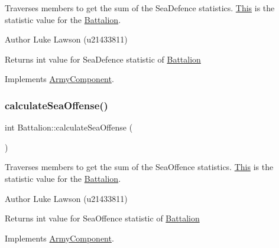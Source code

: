 Traverses members to get the sum of the Sea\+Defence statistics. \mbox{\hyperlink{class_this}{This}} is the statistic value for the \mbox{\hyperlink{class_battalion}{Battalion}}. 

\begin{DoxyAuthor}{Author}
Luke Lawson (u21433811) 
\end{DoxyAuthor}
\begin{DoxyReturn}{Returns}
int value for Sea\+Defence statistic of \mbox{\hyperlink{class_battalion}{Battalion}} 
\end{DoxyReturn}


Implements \mbox{\hyperlink{class_army_component_af5656dd9c12738ec90ea7886fd7ee34a}{Army\+Component}}.

\mbox{\label{class_battalion_a589de99d9bcb79da2bd43303f272d079}} 
\subsubsection{\texorpdfstring{calculateSeaOffense()}{calculateSeaOffense()}}
{\footnotesize\ttfamily int Battalion\+::calculate\+Sea\+Offense (\begin{DoxyParamCaption}{ }\end{DoxyParamCaption})\hspace{0.3cm}{\ttfamily [virtual]}}



Traverses members to get the sum of the Sea\+Offence statistics. \mbox{\hyperlink{class_this}{This}} is the statistic value for the \mbox{\hyperlink{class_battalion}{Battalion}}. 

\begin{DoxyAuthor}{Author}
Luke Lawson (u21433811) 
\end{DoxyAuthor}
\begin{DoxyReturn}{Returns}
int value for Sea\+Offence statistic of \mbox{\hyperlink{class_battalion}{Battalion}} 
\end{DoxyReturn}


Implements \mbox{\hyperlink{class_army_component_a6e29f65ac92c18a82bf4a6a06d6d4457}{Army\+Component}}.

